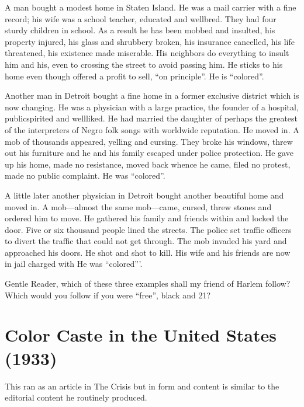 \documentclass[letterpaper,10pt,english]{jupyterBook}
\begin{document}
\sphinxAtStartPar
{} A man bought a modest home in Staten Island. He was a mail carrier with a fine record; his wife was a school teacher, educated and well\sphinxhyphen{}bred. They had four sturdy children in school. As a result he has been mobbed and insulted, his property injured, his glass and shrubbery broken, his insurance cancelled, his life threatened, his existence made miserable.  His neighbors do everything to insult him and his, even to crossing the street to avoid passing him. He sticks to his home even though offered a profit to sell, “on principle”. He is “colored”.

\sphinxAtStartPar
Another man in Detroit bought a fine home in a former exclusive district which is now changing. He was a physician with a large practice, the founder of a hospital, public\sphinxhyphen{}spirited and well\sphinxhyphen{}liked. He had married the daughter of perhaps the greatest of the interpreters of Negro folk songs with world\sphinxhyphen{}wide reputation. He moved in. A mob of thousands appeared, yelling and cursing. They broke his windows, threw out his furniture and he and his family escaped under police protection. He gave up his home, made no resistance, moved back whence he came, filed no protest, made no public complaint. He was “colored”.

\sphinxAtStartPar
A little later another physician in Detroit bought another beautiful home and moved in. A mob—almost the same mob—came, cursed, threw stones and ordered him to move. He gathered his family and friends within and locked the door. Five or six thousand people lined the streets. The police set traffic officers to divert the traffic that could not get through. The mob invaded his yard and approached his doors. He shot and shot to kill. His wife and his friends are now in jail charged with  He was “colored”’.

\sphinxAtStartPar
Gentle Reader, which of these three examples shall my friend of Harlem follow? Which would you follow if you were “free”, black and 21?


\section{Color Caste in the United States (1933)}
\label{\detokenize{Volumes/40/03/Color_caste_in_the_united_states:color-caste-in-the-united-states-1933}}\label{\detokenize{Volumes/40/03/Color_caste_in_the_united_states::doc}}
\begin{sphinxShadowBox}
\sphinxstylesidebartitle{}

\sphinxAtStartPar
This ran as an article in The Crisis but in form and content is similar to the editorial content he routinely produced.
\end{sphinxShadowBox}
\end{document}
